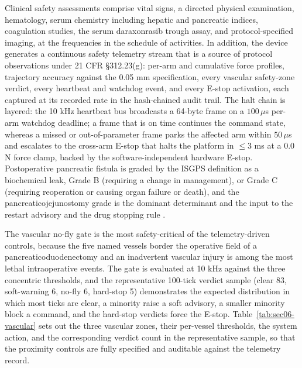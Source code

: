 Clinical safety assessments comprise vital signs, a directed physical examination,
hematology, serum chemistry including hepatic and pancreatic indices, coagulation
studies, the serum daraxonrasib trough assay, and protocol-specified imaging, at the
frequencies in the schedule of activities. In addition, the device generates a
continuous safety telemetry stream that is a source of protocol observations under
21 CFR \S 312.23(g): per-arm and cumulative force profiles, trajectory accuracy
against the 0.05 mm specification, every vascular safety-zone verdict, every
heartbeat and watchdog event, and every E-stop activation, each captured at its
recorded rate in the hash-chained audit trail. The halt chain is layered: the 10 kHz
heartbeat bus broadcasts a 64-byte frame on a $100\,\mu$s per-arm watchdog deadline;
a frame that is on time continues the command state, whereas a missed or
out-of-parameter frame parks the affected arm within $50\,\mu$s and escalates to the
cross-arm E-stop that halts the platform in $\leq 3$ ms at a 0.0 N force clamp,
backed by the software-independent hardware E-stop. Postoperative pancreatic fistula
is graded by the ISGPS definition as a biochemical leak, Grade B (requiring a change
in management), or Grade C (requiring reoperation or causing organ failure or death),
and the pancreaticojejunostomy grade is the dominant determinant and the input to the
restart advisory and the drug stopping rule \cite{daraxwhipple,oncotrialllm}.

The vascular no-fly gate is the most safety-critical of the telemetry-driven
controls, because the five named vessels border the operative field of a
pancreaticoduodenectomy and an inadvertent vascular injury is among the most lethal
intraoperative events. The gate is evaluated at 10 kHz against the three concentric
thresholds, and the representative 100-tick verdict sample (clear 83, soft-warning 6,
no-fly 6, hard-stop 5) demonstrates the expected distribution in which most ticks are
clear, a minority raise a soft advisory, a smaller minority block a command, and the
hard-stop verdicts force the E-stop. Table~\ref{tab:sec06-vascular} sets out the three
vascular zones, their per-vessel thresholds, the system action, and the corresponding
verdict count in the representative sample, so that the proximity controls are fully
specified and auditable against the telemetry record.

